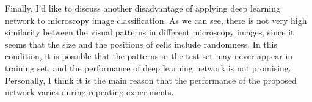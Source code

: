 \documentclass[UTF8]{article}
\begin{document}
Finally,
I'd like to discuss another disadvantage of applying deep learning network to microscopy image classification.
%
As we can see,
there is not very high similarity  between the visual patterns in different microscopy images,
since it seems that the size and the positions of cells include randomness.
%
    In this condition,
it is possible that the patterns in the test set may never appear in training set,
and the performance of deep learning network is not promising.
%
Personally,
I think it is the main reason that the performance of the proposed network varies during repeating experiments.


% 
% 



\small

% 
  
\end{document}
